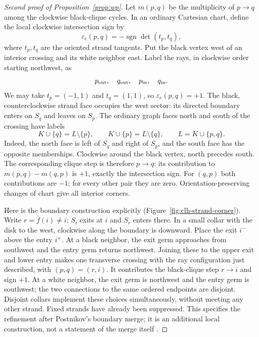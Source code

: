 \documentclass[11pt]{article}
\theoremstyle{definition}
\begin{document}
\begin{proof}[Second proof of Proposition~\ref{prop:wp}]
Let $m(p,q)$ be the multiplicity of $p\to q$ among the clockwise black-clique
cycles. In an ordinary Cartesian chart, define the local clockwise
intersection sign by
\[
  \varepsilon_c(p,q)=-\operatorname{sgn}\det(t_p,t_q),
\]
where $t_p,t_q$ are the oriented strand tangents. Put the black vertex west
of an interior crossing and its white neighbor east. Label the rays, in
clockwise order starting northwest, as
\[
  p_{\rm out},\quad q_{\rm out},\quad
  p_{\rm in},\quad q_{\rm in}.
\]
We may take $t_p=(-1,1)$ and $t_q=(1,1)$, so
$\varepsilon_c(p,q)=+1$. The black, counterclockwise strand face occupies
the west sector: its directed boundary enters on $S_q$ and leaves on $S_p$.
The ordinary graph faces north and south of the crossing have labels
\[
  K\cup\{q\}=L\setminus\{p\},
  \qquad
  K\cup\{p\}=L\setminus\{q\},
  \qquad L=K\cup\{p,q\}.
\]
Indeed, the north face is left of $S_q$ and right of $S_p$, and the south
face has the opposite memberships. Clockwise around the black vertex,
north precedes south. The corresponding clique step is therefore $p\to q$:
its contribution to $m(p,q)-m(q,p)$ is $+1$, exactly the intersection sign.
For $(q,p)$ both contributions are $-1$; for every other pair they are zero.
Orientation-preserving changes of chart give all interior corners.

Here is the boundary construction explicitly (Figure~\ref{fig:clh-strand-corner}). Write $r=\bar f(i)\ne i$;
$S_i$ exits at $i$ and $S_r$ enters there. In a small collar with the disk
to the west, clockwise along the boundary is downward. Place the exit
$i^-$ above the entry $i^+$. At a black neighbor, the exit germ approaches
from southwest and the entry germ returns northwest. Joining these to the
upper exit and lower entry makes one transverse crossing with the ray
configuration just described, with $(p,q)=(r,i)$. It contributes the
black-clique step $r\to i$ and sign $+1$. At a white neighbor, the exit germ
is northwest and the entry germ is southwest; the two connections to the
same ordered endpoints are disjoint. Disjoint collars implement these
choices simultaneously, without meeting any other strand. Fixed strands
have already been suppressed.
This specifies the refinement after Postnikov's boundary merge; it is an
additional local construction, not a statement of the merge itself
\cite[Def.~14.3 and the following map; cf. the construction preceding
Cor.~14.2]{Postnikov}.


\end{proof}
\end{document}
